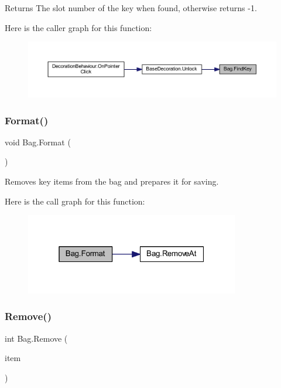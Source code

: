 \begin{DoxyReturn}{Returns}
The slot number of the key when found, otherwise returns -\/1.
\end{DoxyReturn}
Here is the caller graph for this function\+:
\nopagebreak
\begin{figure}[H]
\begin{center}
\leavevmode
\includegraphics[width=350pt]{class_bag_ab913ca67bac7d4a740a470dbb1632311_icgraph}
\end{center}
\end{figure}
\mbox{\label{class_bag_a3ee41396e25179a9c975c6f90d601bdd}} 
\subsubsection{\texorpdfstring{Format()}{Format()}}
{\footnotesize\ttfamily void Bag.\+Format (\begin{DoxyParamCaption}{ }\end{DoxyParamCaption})}



Removes key items from the bag and prepares it for saving. 

Here is the call graph for this function\+:
\nopagebreak
\begin{figure}[H]
\begin{center}
\leavevmode
\includegraphics[width=265pt]{class_bag_a3ee41396e25179a9c975c6f90d601bdd_cgraph}
\end{center}
\end{figure}
\mbox{\label{class_bag_a42a4319aa14d0b6bda7f91070ba57a47}} 
\subsubsection{\texorpdfstring{Remove()}{Remove()}}
{\footnotesize\ttfamily int Bag.\+Remove (\begin{DoxyParamCaption}\item[{\mbox{\hyperlink{class_base_item}{Base\+Item}}}]{item }\end{DoxyParamCaption})}

